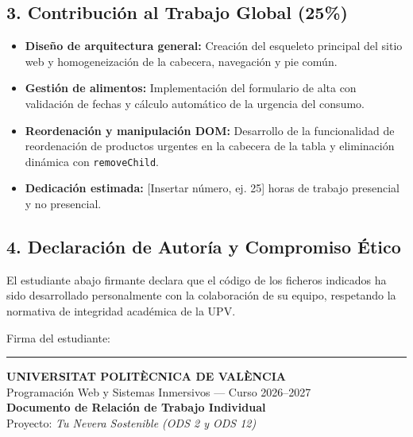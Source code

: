 \documentclass[11pt,a4paper]{article}
\begin{document}
\subsection*{3. Contribución al Trabajo Global (25\%)}
\begin{itemize}
    \item \textbf{Diseño de arquitectura general:} Creación del esqueleto principal del sitio web y homogeneización de la cabecera, navegación y pie común.
    \item \textbf{Gestión de alimentos:} Implementación del formulario de alta con validación de fechas y cálculo automático de la urgencia del consumo.
    \item \textbf{Reordenación y manipulación DOM:} Desarrollo de la funcionalidad de reordenación de productos urgentes en la cabecera de la tabla y eliminación dinámica con \texttt{removeChild}.
    \item \textbf{Dedicación estimada:} [Insertar número, ej. 25] horas de trabajo presencial y no presencial.
\end{itemize}

\subsection*{4. Declaración de Autoría y Compromiso Ético}
El estudiante abajo firmante declara que el código de los ficheros indicados ha sido desarrollado personalmente con la colaboración de su equipo, respetando la normativa de integridad académica de la UPV.

\vspace{1.2cm}
\begin{flushright}
    Firma del estudiante:\ \rule{6cm}{0.4pt}
\end{flushright}

\newpage

\begin{center}
    {\Large \textbf{UNIVERSITAT POLITÈCNICA DE VALÈNCIA}}\\[0.2cm]
    {\large Programación Web y Sistemas Inmersivos --- Curso 2026--2027}\\[0.3cm]
    {\LARGE \textbf{\color{azulOscuro}Documento de Relación de Trabajo Individual}}\\[0.2cm]
    {\small Proyecto: \textit{Tu Nevera Sostenible (ODS 2 y ODS 12)}}
\end{center}
\end{document}
